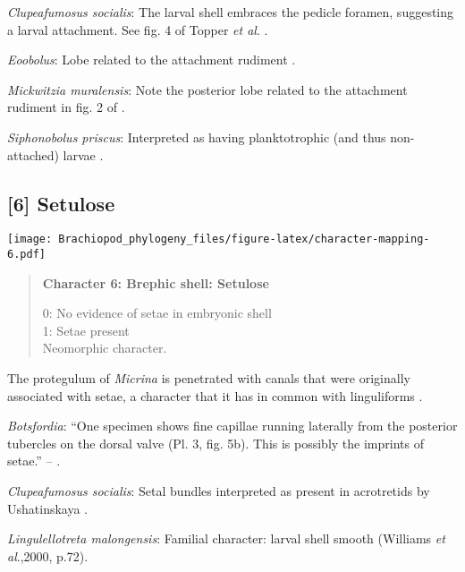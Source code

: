 \documentclass[openany]{book}
\theoremstyle{definition}
\theoremstyle{definition}
\theoremstyle{definition}
\theoremstyle{remark}
\begin{document}
\hypertarget{Clupeafumosus_socialis-coding-5}{}
\emph{Clupeafumosus socialis}: The larval shell embraces the pedicle
foramen, suggesting a larval attachment. See fig. 4 of Topper \emph{et
al}. \citeyearpar{Topper2013Reappraisalof}.

\hypertarget{Eoobolus-coding-5}{}
\emph{Eoobolus}: Lobe related to the attachment rudiment \citep[fig.
2]{Balthasar2009Thebrachiopod}.

\hypertarget{Mickwitzia_muralensis-coding-5}{}
\emph{Mickwitzia muralensis}: Note the posterior lobe related to the
attachment rudiment in fig. 2 of \citet{Balthasar2009Thebrachiopod}.

\hypertarget{Siphonobolus_priscus-coding-5}{}
\emph{Siphonobolus priscus}: Interpreted as having planktotrophic (and
thus non-attached) larvae \citep{Popov2009Earlyontogeny}.

\subsection*{{[}6{]} Setulose}\label{setulose}

\texttt{[image: Brachiopod\_phylogeny\_files/figure-latex/character-mapping-6.pdf]}

\begin{quote}
\textbf{Character 6: Brephic shell: Setulose}

0: No evidence of setae in embryonic shell\\
1: Setae present\\
Neomorphic character.
\end{quote}

The protegulum of \emph{Micrina} is penetrated with canals that were
originally associated with setae, a character that it has in common with
linguliforms \citep{Holmer2011Firstrecord}.

\hypertarget{Botsfordia-coding-6}{}
\emph{Botsfordia}: ``One specimen shows fine capillae running laterally
from the posterior tubercles on the dorsal valve (Pl. 3, fig. 5b). This
is possibly the imprints of setae.'' --
\citet{Ushatinskaya2016Revisionof}.

\hypertarget{Clupeafumosus_socialis-coding-6}{}
\emph{Clupeafumosus socialis}: Setal bundles interpreted as present in
acrotretids by Ushatinskaya \citeyearpar{Ushatinskaya2016Protegulumand}.

\hypertarget{Lingulellotreta_malongensis-coding-6}{}
\emph{Lingulellotreta malongensis}: Familial character: larval shell
smooth (Williams \emph{et al}.,2000, p.72).
\end{document}
